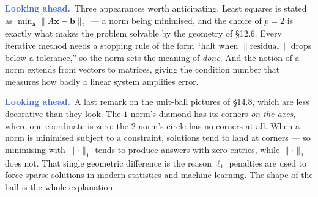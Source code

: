 \documentclass[11pt]{article}
\theoremstyle{definition}
\theoremstyle{remark}
\newcommand{\lookahead}{\par\smallskip\noindent
  \textbf{\sffamily\textcolor{RoyalBlue}{Looking ahead.}}\ \ignorespaces}
\newcommand{\vc}[1]{\mathbf{#1}}
\newcommand{\norm}[1]{\lVert #1\rVert}
\begin{document}
\lookahead Three appearances worth anticipating. Least squares is stated as
$\min_{\vc{x}}\norm{A\vc{x}-\vc{b}}_2$ --- a norm being minimised, and the choice
of $p=2$ is exactly what makes the problem solvable by the geometry of \S12.6.
Every iterative method needs a stopping rule of the form ``halt when
$\norm{\text{residual}}$ drops below a tolerance,'' so the norm sets the meaning
of \emph{done}. And the notion of a norm extends from vectors to matrices,
giving the condition number that measures how badly a linear system amplifies
error.

\lookahead A last remark on the unit-ball pictures of \S14.8, which are less
decorative than they look. The $1$-norm's diamond has its corners \emph{on the
axes}, where one coordinate is zero; the $2$-norm's circle has no corners at all.
When a norm is minimised subject to a constraint, solutions tend to land at
corners --- so minimising with $\norm{\cdot}_1$ tends to produce answers with
zero entries, while $\norm{\cdot}_2$ does not. That single geometric difference
is the reason $\ell_1$ penalties are used to force sparse solutions in modern
statistics and machine learning. The shape of the ball is the whole explanation.
\end{document}
